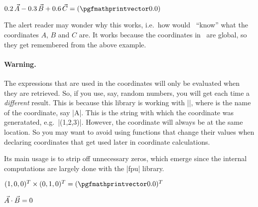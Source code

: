\documentclass[a4paper,fleqn]{ltxdoc}
\begin{document}
\begin{codeexample}[width=6.5cm]
%
$0.2\,\vec A-0.3\,\vec B+0.6\,\vec C
=(\pgfmathprintvector\pgfmathresult)$
\end{codeexample}

The alert reader may wonder why this works, i.e.\ how would \tikzname\ ``know''
what the coordinates $A$, $B$ and $C$ are. It works because the coordinates in
\tikzname\ are global, so they get remembered from the above example.

\paragraph{Warning.} The expressions that are used in the coordinates will only
be evaluated when they are retrieved. So, if you use, say, random numbers, you
will get each time a \emph{different} result. This is because this library is
working with |\tikz@dcl@coord@|, where  is the name of
the coordinate, say |A|. This is the string with which the coordinate was
generatated, e.g.\ |(1,2,3)|. However, the coordinate will always be at the same location. So
you may want to avoid using functions that change their values when declaring
coordinates that get used later in coordinate calculations. 

\begin{codeexample}[width=4.5cm]
\end{codeexample}

Its main usage is to strip off unnecessary zeros, which emerge since the
internal computations are largely done with the |fpu| library.

\begin{codeexample}[width=5.2cm]
%
$(1,0,0)^T\times(0,1,0)^T=
(\pgfmathprintvector\pgfmathresult)^T$
\end{codeexample}

\begin{codeexample}[width=5.2cm]
%
$\vec A\cdot \vec B=
\pgfmathprintnumber\pgfmathresult$
\end{codeexample}
\end{document}
